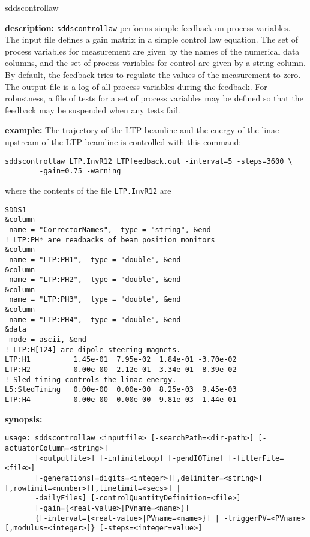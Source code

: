 \begin{sddsprog}{sddscontrollaw}
\item \textbf{description:}
\verb+sddscontrollaw+ performs simple feedback on process variables.
The input file defines a gain matrix in a simple control law equation. The set of process variables for
measurement are given by the names of the numerical data columns, and the set
of process variables for control are given by a string column. By default,
the feedback tries to regulate the values of the measurement to zero.
The output file is a log of all process variables during the feedback.
For robustness, a file of tests for a set of process variables may be defined 
so that the feedback may be suspended when any tests fail.

\item \textbf{example:} 
% 
The trajectory of the LTP beamline and the energy of the linac upstream of the LTP
beamline is controlled with this command:
\begin{verbatim}
sddscontrollaw LTP.InvR12 LTPfeedback.out -interval=5 -steps=3600 \
        -gain=0.75 -warning
\end{verbatim}
where the contents of the file \verb+LTP.InvR12+ are
\begin{verbatim}
SDDS1
&column
 name = "CorrectorNames",  type = "string", &end
! LTP:PH* are readbacks of beam position monitors
&column
 name = "LTP:PH1",  type = "double", &end
&column             
 name = "LTP:PH2",  type = "double", &end
&column             
 name = "LTP:PH3",  type = "double", &end
&column             
 name = "LTP:PH4",  type = "double", &end
&data
 mode = ascii, &end
! LTP:H[124] are dipole steering magnets.
LTP:H1          1.45e-01  7.95e-02  1.84e-01 -3.70e-02 
LTP:H2          0.00e-00  2.12e-01  3.34e-01  8.39e-02 
! Sled timing controls the linac energy.
L5:SledTiming   0.00e-00  0.00e-00  8.25e-03  9.45e-03 
LTP:H4          0.00e-00  0.00e-00 -9.81e-03  1.44e-01 
\end{verbatim}
\item \textbf{synopsis:} 
\begin{verbatim}
usage: sddscontrollaw <inputfile> [-searchPath=<dir-path>] [-actuatorColumn=<string>]
       [<outputfile>] [-infiniteLoop] [-pendIOTime] [-filterFile=<file>]
       [-generations[=digits=<integer>][,delimiter=<string>][,rowlimit=<number>][,timelimit=<secs>] |
       -dailyFiles] [-controlQuantityDefinition=<file>]
       [-gain={<real-value>|PVname=<name>}]
       {[-interval={<real-value>|PVname=<name>}] | -triggerPV=<PVname>[,modulus=<integer>]} [-steps=<integer=value>]

\end{verbatim}
\end{sddsprog}
